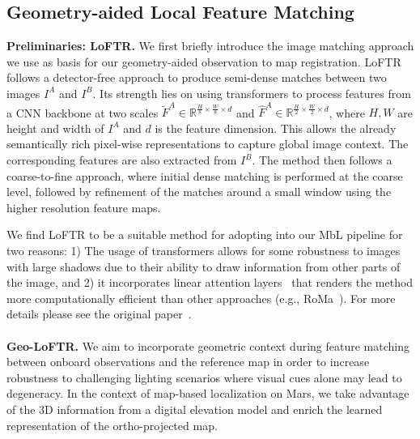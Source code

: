 \subsection{\label{subsec:geo-loftr}Geometry-aided Local Feature Matching}
\noindent \textbf{Preliminaries: LoFTR.}
We first briefly introduce the image matching approach we use as basis for our geometry-aided observation to map registration. LoFTR follows a detector-free approach to produce semi-dense matches between two images $I^A$ and $I^B$. Its strength lies on using transformers to process features from a CNN backbone at two scales $\tilde{F}^A \in \mathbb{R}^{\frac{H}{8} \times \frac{W}{8} \times d}$ and $\hat{F}^A \in \mathbb{R}^{\frac{H}{2} \times \frac{W}{2} \times d}$, where $H,W$ are height and width of $I^A$ and $d$ is the feature dimension. This allows the already semantically rich pixel-wise representations to capture global image context. The corresponding features are also extracted from $I^B$. The method then follows a coarse-to-fine approach, where initial dense matching is performed at the coarse level, followed by refinement of the matches around a small window using the higher resolution feature maps.

We find LoFTR to be a suitable method for adopting into our MbL pipeline for two reasons: 1) The usage of transformers allows for some robustness to images with large shadows due to their ability to draw information from other parts of the image, and 2) it incorporates linear attention layers~\cite{katharopoulos2020transformers} that renders the method more computationally efficient than other approaches (e.g., RoMa~\cite{roma}). For more details please see the original paper~\cite{loftr}.
\\
\\
\noindent \textbf{Geo-LoFTR.}
We aim to incorporate geometric context during feature matching between onboard observations and the reference map in order to increase robustness to challenging lighting scenarios where visual cues alone may lead to degeneracy.
In the context of map-based localization on Mars, we take advantage of the 3D information from a digital elevation model and enrich the learned representation of the ortho-projected map.

